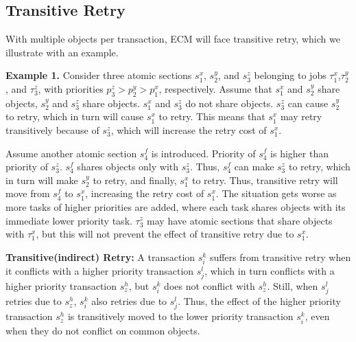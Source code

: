 \subsection{Transitive Retry}\label{subsec:ecm_transitive_retry}
%
With multiple objects per transaction, ECM will face transitive retry, which we illustrate with an example.

\textbf{Example 1.} Consider three atomic sections $s_{1}^{x}$, $s_{2}^{y}$, 
and $s_{3}^{z}$ belonging to jobs $\tau_{1}^{x}$,$\tau_{2}^{y}$, 
and $\tau_{3}^{z}$, with priorities $p_{3}^{z}>p_{2}^{y}>p_{1}^{x}$, respectively. 
Assume that $s_{1}^{x}$ and $s_{2}^{y}$ share objects, $s_{2}^{y}$ and $s_{3}^{z}$
share objects. $s_{1}^{x}$ and $s_{3}^{z}$ do not share objects.
$s_{3}^{z}$ can cause $s_{2}^{y}$ to retry, which in turn will cause $s_{1}^{x}$ to retry. 
This means that $s_{1}^{x}$ may retry transitively
because of $s_{3}^{z}$, which will increase the retry cost of $s_{1}^{x}$.

Assume another atomic section $s_4^f$ is introduced. Priority of $s_4^f$ is higher than priority of $s_3^z$. $s_4^f$ shares objects only with $s_3^z$. Thus, $s_4^f$ can make $s_3^z$ to retry, which in turn will make $s_2^y$ to retry, and finally, $s_1^x$ to retry. Thus, transitive retry will move from $s_{4}^{f}$ to $s_{1}^{x}$, increasing the retry cost of $s_{1}^{x}$. 
The situation gets worse as more tasks of higher priorities are added, where each task
shares objects with its immediate lower priority task. $\tau_{3}^{z}$
may have atomic sections that share objects with $\tau_{1}^{x}$,
but this will not prevent the effect of transitive retry due to $s_{1}^{x}$.

\begin{mydef}
\textbf{Transitive(indirect) Retry:} A transaction $s_{i}^{k}$ suffers from
transitive retry when it conflicts with a higher priority transaction
$s_{j}^{l}$, which in turn conflicts with a higher priority transaction
$s_{z}^{h}$, but $s_{i}^{k}$ does not conflict with $s_{z}^{h}$.
Still, when $s_{j}^{l}$ retries due to $s_{z}^{h}$, $s_{i}^{k}$
also retries due to $s_{j}^{l}$. Thus, the effect of the higher priority
transaction $s_{z}^{h}$ is transitively moved to the lower priority
transaction $s_{i}^{k}$, even when they do not conflict on common objects.
\end{mydef}

